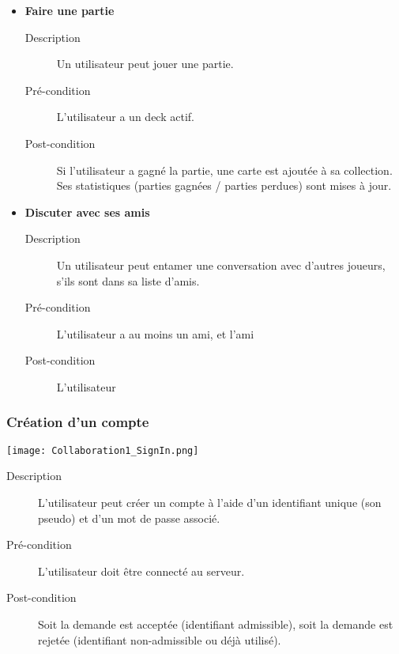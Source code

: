 \documentclass{article}
\begin{document}
\begin{itemize}
				\item \textbf{Faire une partie}
				\begin{description}
					\item[Description] Un utilisateur peut jouer une partie.
					\item[Pré-condition] L'utilisateur a un deck actif.
					\item[Post-condition] Si l'utilisateur a gagné la partie, une carte est ajoutée à sa collection.
					Ses statistiques (parties gagnées / parties perdues) sont mises à jour.\\
				\end{description}

				\item \textbf{Discuter avec ses amis}
				\begin{description}
					\item[Description] Un utilisateur peut entamer une conversation avec d'autres joueurs, s'ils sont dans sa liste d'amis.
					\item[Pré-condition] L'utilisateur a au moins un ami, et l'ami
					\item[Post-condition] L'utilisateur\\
				\end{description}
			\end{itemize}

		\subsubsection{Création d'un compte}
			\begin{center}\texttt{[image: Collaboration1\_SignIn.png]}\end{center}

			\begin{description}
				\item[Description] L'utilisateur peut créer un compte à l'aide d'un identifiant unique (son pseudo) et d'un mot de passe associé.
				\item[Pré-condition] L'utilisateur doit être connecté au serveur.
				\item[Post-condition] Soit la demande est acceptée (identifiant admissible), soit la demande est rejetée (identifiant non-admissible ou déjà utilisé).
			\end{description}
\end{document}
